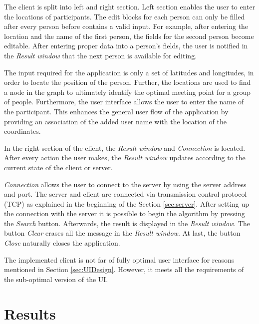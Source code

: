 \documentclass[thesis=M,english]{FITthesis}[2012/10/20]
\begin{document}
The client is split into left and right section. Left section enables the user to enter the locations of participants. The edit blocks for each person can only be filled after every person before contains a valid input. For example, after entering the location and the name of the first person, the fields for the second person become editable. After entering proper data into a person's fields, the user is notified in the \textit{Result window} that the next person is available for editing. 

The input required for the application is only a set of latitudes and longitudes, in order to locate the position of the person. Further, the locations are used to find a node in the graph to ultimately identify the optimal meeting point for a group of people. Furthermore, the user interface allows the user to enter the name of the participant. This enhances the general user flow of the application by providing an association of the added user name with the location of the coordinates.

In the right section of the client, the \textit{Result window} and \textit{Connection} is located. After every action the user makes, the \textit{Result window} updates according to the current state of the client or server.

\textit{Connection} allows the user to connect to the server by using the server address and port. The server and client are connected via transmission control protocol (TCP) as explained in the beginning of the Section \ref{sec:server}. After setting up the connection with the server it is possible to begin the algorithm by pressing the \textit{Search} button. Afterwards, the result is displayed in the \textit{Result window}. The button \textit{Clear} erases all the message in the \textit{Result window}. At last, the button \textit{Close} naturally closes the application.


The implemented client is not far of fully optimal user interface for reasons mentioned in Section \ref{sec:UIDesign}. However, it meets all the requirements of the sub-optimal version of the UI. 


\chapter{Results}
\label{ch:Results}
\end{document}

